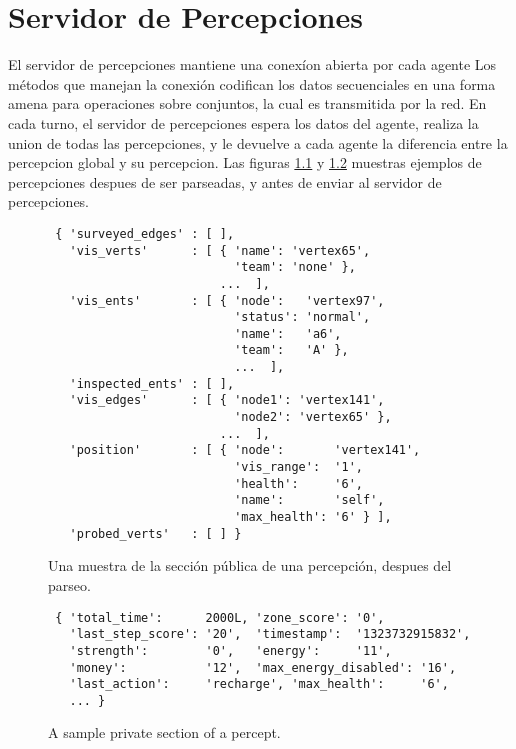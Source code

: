 
\chapter{Servidor de Percepciones}
 \label{chap:servidor_de_percepciones}

 El servidor de percepciones mantiene una conexíon abierta por cada agente
 Los métodos que manejan la conexión codifican los datos secuenciales en una 
 forma amena para operaciones sobre conjuntos, la cual es transmitida por la red.
 En cada turno, el servidor de percepciones espera los datos del agente, 
 realiza la union de todas las percepciones, y le devuelve a cada agente la 
 diferencia entre la percepcion global y su percepcion. 
 Las figuras \ref{fig:pythonperceptpublic} y \ref{fig:pythonperceptprivate}
 muestras ejemplos de percepciones despues de ser parseadas, y antes de enviar
 al servidor de percepciones.

 \begin{figure}
 \centering
 \begin{small}
 \begin{verbatim}
 { 'surveyed_edges' : [ ], 
   'vis_verts'      : [ { 'name': 'vertex65',  
                          'team': 'none' }, 
                        ...  ],  
   'vis_ents'       : [ { 'node':   'vertex97',  
                          'status': 'normal', 
                          'name':   'a6',  
                          'team':   'A' }, 
                          ...  ],  
   'inspected_ents' : [ ],  
   'vis_edges'      : [ { 'node1': 'vertex141', 
                          'node2': 'vertex65' }, 
                        ...  ], 
   'position'       : [ { 'node':       'vertex141', 
                          'vis_range':  '1', 
                          'health':     '6', 
                          'name':       'self', 
                          'max_health': '6' } ], 
   'probed_verts'   : [ ] }
 \end{verbatim}
 \end{small}
 \caption{Una muestra de la sección pública de una percepción, despues del parseo.}
 \label{fig:pythonperceptpublic}
 \end{figure}
 
 \begin{figure}
 \begin{verbatim}
 { 'total_time':      2000L, 'zone_score': '0',            
   'last_step_score': '20',  'timestamp':  '1323732915832',       
   'strength':        '0',   'energy':     '11',                  
   'money':           '12',  'max_energy_disabled': '16',                  
   'last_action':     'recharge', 'max_health':     '6',
   ... }
 \end{verbatim}
 \caption{A sample private section of a percept.}
 \label{fig:pythonperceptprivate}
 \end{figure}

